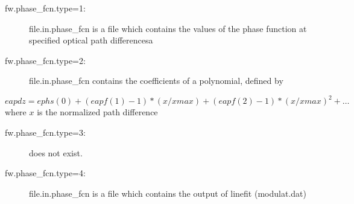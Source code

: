 \documentclass[a4paper]{article}
\begin{document}
\begin{description}
\item [fw.phase\_fcn.type=1:] file.in.phase\_fcn is a file which contains the values of the phase function at specified optical path differencesa 
\item[fw.phase\_fcn.type=2:]  file.in.phase\_fcn contains the coefficients of a polynomial, defined
  by
\end{description}
\begin{equation}
  eapdz = ephs(0) + (eapf(1)-1)*(x/xmax) + (eapf(2)-1)*(x/xmax)^2 + \ldots
\end{equation}
where $x$ is the normalized path difference
\begin{description}
\item [fw.phase\_fcn.type=3:] does not exist.
\item [fw.phase\_fcn.type=4:] file.in.phase\_fcn is a file which contains the output of linefit (modulat.dat)
\end{description}
\end{document}
